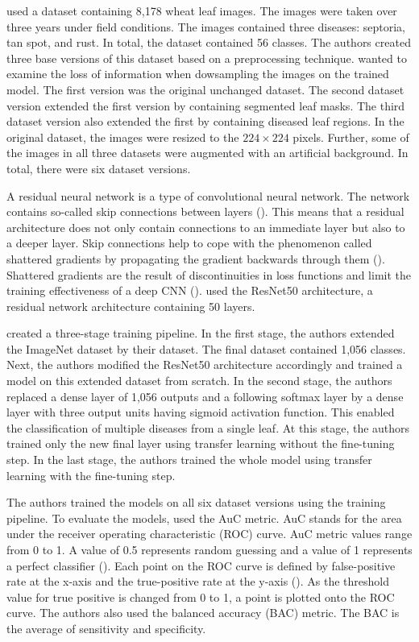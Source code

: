 \documentclass{BachelorBUI}
\begin{document}
        \textcite{Picon:2019} used a dataset containing 8,178 wheat leaf images. The images were taken over three years under field conditions. The images contained three diseases: septoria, tan spot, and rust. In total, the dataset contained 56 classes. The authors created three base versions of this dataset based on a preprocessing technique. \textcite{Picon:2019} wanted to examine the loss of information when dowsampling the images on the trained model. The first version was the original unchanged dataset. The second dataset version extended the first version by containing segmented leaf masks. The third dataset version also extended the first by containing diseased leaf regions. In the original dataset, the images were resized to the $224 \times 224$ pixels. Further, some of the images in all three datasets were augmented with an artificial background. In total, there were six dataset versions. 

        A residual neural network is a type of convolutional neural network. The network contains so-called skip connections between layers (\cite{Aggarwal:2018}). This means that a residual architecture does not only contain connections to an immediate layer but also to a deeper layer. Skip connections help to cope with the phenomenon called shattered gradients by propagating the gradient backwards through them (\cite{Bishop:2024}). Shattered gradients are the result of discontinuities in loss functions and limit the training effectiveness of a deep CNN (\cite{Bishop:2024}). \textcite{Picon:2019} used the ResNet50 architecture, a residual network architecture containing 50 layers.

        \textcite{Picon:2019} created a three-stage training pipeline. In the first stage, the authors extended the ImageNet dataset by their dataset. The final dataset contained 1,056 classes. Next, the authors modified the ResNet50 architecture accordingly and trained a model on this extended dataset from scratch. In the second stage, the authors replaced a dense layer of 1,056 outputs and a following softmax layer by a dense layer with three output units having sigmoid activation function. This enabled the classification of multiple diseases from a single leaf. At this stage, the authors trained only the new final layer using transfer learning without the fine-tuning step. In the last stage, the authors trained the whole model using transfer learning with the fine-tuning step.

        The authors trained the models on all six dataset versions using the training pipeline. To evaluate the models, \textcite{Picon:2019} used the AuC metric. AuC stands for the area under the receiver operating characteristic (ROC) curve. AuC metric values range from 0 to 1. A value of 0.5 represents random guessing and a value of 1 represents a perfect classifier (\cite{Bishop:2024}). Each point on the ROC curve is defined by false-positive rate at the x-axis and the true-positive rate at the y-axis (\cite{Murphy:2022}). As the threshold value for true positive is changed from 0 to 1, a point is plotted onto the ROC curve. The authors also used the balanced accuracy (BAC) metric. The BAC is the average of sensitivity and specificity. 
\end{document}
